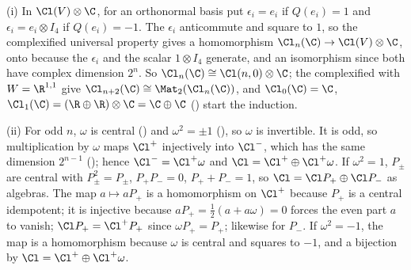 (i) In $\Cl(V) \otimes \C$, for an orthonormal basis put $\epsilon_i = e_i$ if $Q(e_i) = 1$ and $\epsilon_i = e_i \otimes I_4$ if $Q(e_i) = -1$. The $\epsilon_i$ anticommute and square to $1$, so the complexified universal property gives a homomorphism $\Cl_n(\C) \to \Cl(V) \otimes \C$, onto because the $\epsilon_i$ and the scalar $1 \otimes I_4$ generate, and an isomorphism since both have complex dimension $2^{n}$. So $\Cl_n(\C) \cong \Cl(n, 0) \otimes \C$; the complexified  with $W = \R^{1,1}$ give $\Cl_{n+2}(\C) \cong \Mat_2(\Cl_n(\C))$, and $\Cl_0(\C) = \C$, $\Cl_1(\C) = (\R \oplus \R) \otimes \C = \C \oplus \C$ () start the induction.

(ii) For odd $n$, $\omega$ is central () and $\omega^{2} = \pm 1$ (), so $\omega$ is invertible. It is odd, so multiplication by $\omega$ maps $\Cl^{+}$ injectively into $\Cl^{-}$, which has the same dimension $2^{n-1}$ (); hence $\Cl^{-} = \Cl^{+}\omega$ and $\Cl = \Cl^{+} \oplus \Cl^{+}\omega$. If $\omega^{2} = 1$, $P_{\pm}$ are central with $P_\pm^{2} = P_\pm$, $P_+ P_- = 0$, $P_+ + P_- = 1$, so $\Cl = \Cl P_+ \oplus \Cl P_-$ as algebras. The map $a \mapsto aP_+$ is a homomorphism on $\Cl^{+}$ because $P_+$ is a central idempotent; it is injective because $aP_+ = \tfrac12(a + a\omega) = 0$ forces the even part $a$ to vanish; $\Cl P_+ = \Cl^{+} P_+$ since $\omega P_+ = P_+$; likewise for $P_-$. If $\omega^{2} = -1$, the map is a homomorphism because $\omega$ is central and squares to $-1$, and a bijection by $\Cl = \Cl^{+} \oplus \Cl^{+}\omega$.
